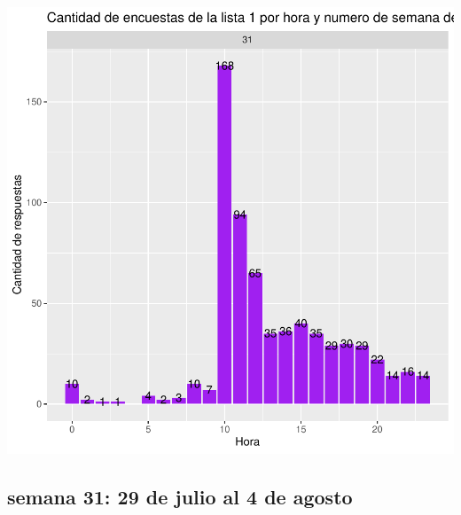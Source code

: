 \documentclass{article}
\begin{document}
\includegraphics{seguimientov5-012}

\subsection{semana 31: 29 de julio al 4 de agosto}
\end{document}
